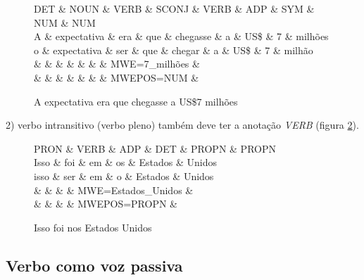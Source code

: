\documentclass[output=paper,colorlinks,citecolor=brown]{langscibook}
\begin{document}
\begin{figure}[htbp]
    \centering
    \vspace{.8cm}
    \begin{dependency}
    \begin{deptext}
    DET \& NOUN \& VERB \& SCONJ \& VERB \& ADP \& SYM \& NUM \& NUM \\
    A \& expectativa \& era \& que \& chegasse \& a \& US\$ \& 7 \& milhões \\
    o \& expectativa \& ser \& que \& chegar \& a \& US\$ \& 7 \& milhão \\
    \& \& \& \& \& \& \& MWE=7\_milhões \& \\
    \& \& \& \& \& \& \& MWEPOS=NUM \& \\
    \end{deptext}
    \end{dependency}
    \caption{A expectativa era que chegasse a US\$7 milhões}\label{dep:serVERB}
\end{figure}

2)  verbo intransitivo (verbo pleno) também deve ter a anotação \textit{VERB} (figura \ref{dep:serVERB2}).

\begin{figure}[htbp]
    \centering
    \vspace{.8cm}
    \begin{dependency}
    \begin{deptext}
    PRON \& VERB \& ADP \& DET \& PROPN \& PROPN \\
    Isso \& foi \& em \& os \& Estados \& Unidos \\
    isso \& ser \& em \& o \& Estados \& Unidos \\
    \& \& \& \& MWE=Estados_Unidos \& \\
    \& \& \& \& MWEPOS=PROPN \& \\
    \end{deptext}
    \end{dependency}
    \caption{Isso foi nos Estados Unidos}\label{dep:serVERB2}
\end{figure}


\subsection{Verbo  como voz passiva}\label{sec:serpassiva}
\end{document}
